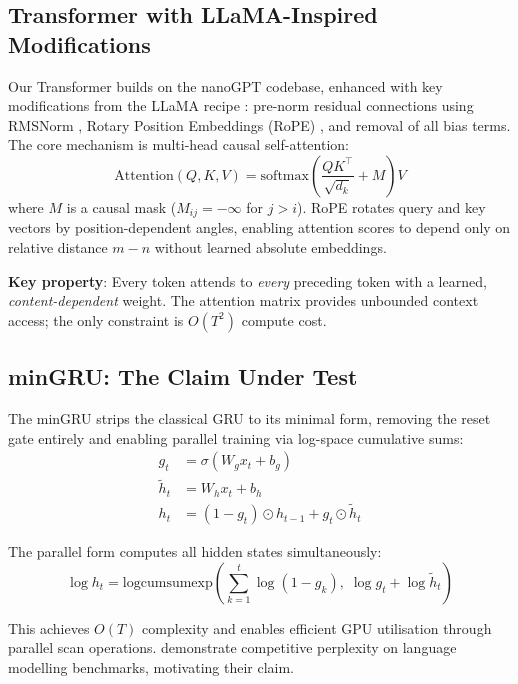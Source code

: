 \documentclass[10pt,a4paper]{article}
\begin{document}
\subsection{Transformer with LLaMA-Inspired Modifications}

Our Transformer builds on the nanoGPT codebase, enhanced with key modifications from the LLaMA recipe \citep{touvron2023llama}: pre-norm residual connections using RMSNorm \citep{zhang2019root}, Rotary Position Embeddings (RoPE) \citep{su2024roformer}, and removal of all bias terms. The core mechanism is multi-head causal self-attention:
\begin{equation}
    \text{Attention}(Q, K, V) = \text{softmax}\left(\frac{QK^\top}{\sqrt{d_k}} + M\right)V
\end{equation}
where $M$ is a causal mask ($M_{ij} = -\infty$ for $j > i$). RoPE rotates query and key vectors by position-dependent angles, enabling attention scores to depend only on relative distance $m - n$ without learned absolute embeddings.

\textbf{Key property}: Every token attends to \emph{every} preceding token with a learned, \emph{content-dependent} weight. The attention matrix provides unbounded context access; the only constraint is $O(T^2)$ compute cost.

\subsection{minGRU: The Claim Under Test}

The minGRU \citep{feng2024were} strips the classical GRU to its minimal form, removing the reset gate entirely and enabling parallel training via log-space cumulative sums:
\begin{align}
    g_t &= \sigma(W_g x_t + b_g) \label{eq:mingru_gate} \\
    \tilde{h}_t &= W_h x_t + b_h \\
    h_t &= (1 - g_t) \odot h_{t-1} + g_t \odot \tilde{h}_t
\end{align}

The parallel form computes all hidden states simultaneously:
\begin{equation}
    \log h_t = \text{logcumsumexp}\left(\sum_{k=1}^{t} \log(1-g_k),\; \log g_t + \log \tilde{h}_t\right)
\end{equation}

This achieves $O(T)$ complexity and enables efficient GPU utilisation through parallel scan operations. \citet{feng2024were} demonstrate competitive perplexity on language modelling benchmarks, motivating their claim.
\end{document}
